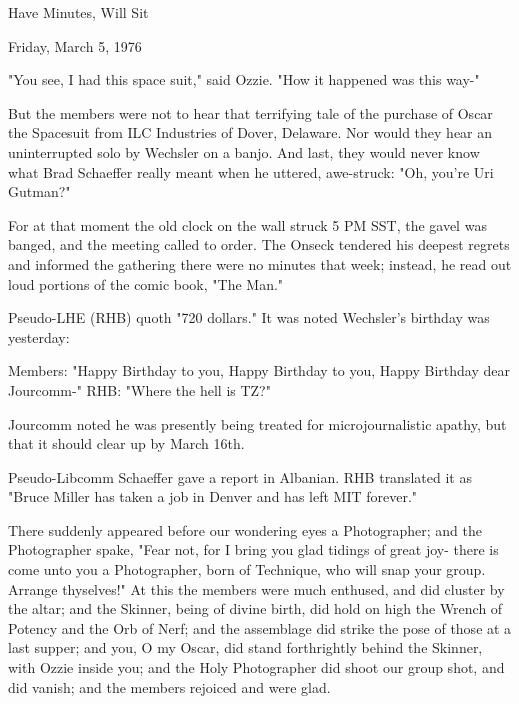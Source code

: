 \documentclass[12pt]{article}
\begin{document}
\begin{center}

Have Minutes, Will Sit

Friday, March 5, 1976

\end{center}
 
\vspace{12pt}

\setlength{\parskip}{6pt}

\noindent
"You see, I had this space suit," said Ozzie. "How it happened was this way-"

But the members were not to hear that terrifying tale of the purchase of Oscar the Spacesuit from ILC Industries of Dover, Delaware. Nor would they hear an uninterrupted solo by Wechsler on a banjo. And last, they would never know what Brad Schaeffer really meant when he uttered, awe-struck: "Oh, you're Uri Gutman?"

For at that moment the old clock on the wall struck 5 PM SST, the gavel was banged, and the meeting called to order. The Onseck tendered his deepest regrets and informed the gathering there were no minutes that week; instead, he read out loud portions of the comic book, "The Man."

Pseudo-LHE (RHB) quoth "720 dollars." It was noted Wechsler's birthday was yesterday:

Members: "Happy Birthday to you, Happy Birthday to you, Happy Birthday dear Jourcomm-" RHB: "Where the hell is TZ?"

Jourcomm noted he was presently being treated for microjournalistic apathy, but that it should clear up by March 16th.

Pseudo-Libcomm Schaeffer gave a report in Albanian. RHB translated it as "Bruce Miller has taken a job in Denver and has left MIT forever."

There suddenly appeared before our wondering eyes a Photographer; and the Photographer spake, "Fear not, for I bring you glad tidings of great joy- there is come unto you a Photographer, born of Technique, who will snap your group. Arrange thyselves!" At this the members were much enthused, and did cluster by the altar; and the Skinner, being of divine birth, did hold on high the Wrench of Potency and the Orb of Nerf; and the assemblage did strike the pose of those at a last supper; and you, O my Oscar, did stand forthrightly behind the Skinner, with Ozzie inside you; and the Holy Photographer did shoot our group shot, and did vanish; and the members rejoiced and were glad.
\end{document}
